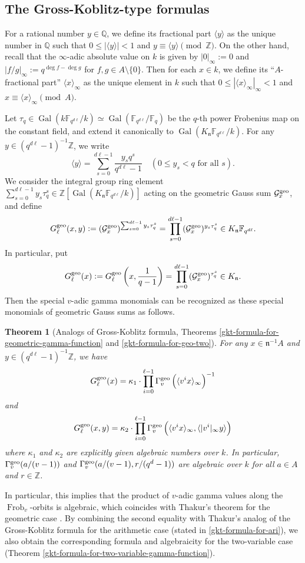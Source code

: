 \documentclass[11pt]{amsart}
\theoremstyle{plain}
\newtheorem{thm}{Theorem}[subsection]
\theoremstyle{definition}
\theoremstyle{remark}
\numberwithin{equation}{section}
\newcommand{\ZZ}{\mathbb{Z}}
\newcommand{\QQ}{\mathbb{Q}}
\newcommand{\FF}{\mathbb{F}}
\newcommand{\nfk}{\mathfrak{n}}
\newcommand{\Gcal}{\mathcal{G}}
\newcommand{\Gal}{\operatorname{Gal}}
\newcommand{\Frob}{\operatorname{Frob}}
\newcommand{\ang}[1]{\langle #1 \rangle}
\newcommand{\anginf}[1]{\langle #1 \rangle_\infty}
\newcommand{\Fq}{\FF_q}
\newcommand{\Fqdl}{\FF_{q^{d\l}}}
\newcommand{\vgg}{\Gamma_v^{\textnormal{geo}}}
\newcommand{\bggs}{\Gcal^{\textnormal{geo}}}
\newcommand{\ggs}{G_\l^{\textnormal{geo}}}
\let\l\ell
\begin{document}
	\subsection{The Gross-Koblitz-type formulas}
	
	For a rational number $y \in \QQ$, we define its fractional part $\ang{y}$ as the unique number in $\QQ$ such that $0 \leq |\ang{y}| <1$ and $y \equiv \ang{y} \pmod{\ZZ}$.
	On the other hand, recall that the $\infty$-adic absolute value on $k$ is given by $|0|_\infty := 0$ and $|f/g|_\infty := q^{\deg f - \deg g}$ for $f,g \in A \setminus\{0\}$.
	Then for each $x \in k$, we define its “$A$-fractional part” $\anginf{x}$ as the unique element in $k$ such that $0 \leq |\anginf{x}|_\infty < 1$ and $x \equiv \anginf{x} \pmod{A}$.
	
	Let $\tau_q \in \Gal(k\Fqdl/k) \simeq \Gal(\Fqdl/\Fq)$ be the $q$-th power Frobenius map on the constant field, and extend it canonically to $\Gal(K_\nfk\Fqdl/k)$.
	For any $y \in (q^{d\l}-1)^{-1} \ZZ$, we write
	$$
	\ang{y} = \sum_{s=0}^{d\l-1} \frac{y_s q^s}{q^{d\l}-1}
	\quad
	(0 \leq y_s < q \text{ for all } s).
	$$
	We consider the integral group ring element $\sum_{s=0}^{d\l-1} y_s \tau_q^s \in \ZZ[\Gal(K_\nfk\Fqdl/k)]$ acting on the geometric Gauss sum $\bggs_x$, and define
	$$
	\ggs(x,y)
	:= (\bggs_x)^{\sum_{s=0}^{d\l-1} y_s \tau_q^s}
	= \prod_{s=0}^{d\l-1} (\bggs_x)^{y_s \tau_q^s} \in K_\nfk\Fqdl.
	$$
	In particular, put
	$$
	\ggs(x)
	:= \ggs \left(x , \frac{1}{q-1} \right)
	= \prod_{s=0}^{d\l-1} (\bggs_x)^{\tau_q^s} \in K_\nfk.
	$$
	Then the special $v$-adic gamma monomials can be recognized as these special monomials of geometric Gauss sums as follows.
	
	\begin{thm}[Analogs of Gross-Koblitz formula, Theorems \ref{gkt-formula-for-geometric-gamma-function} and \ref{gkt-formula-for-geo-two}]
		For any $x \in \nfk^{-1}A$ and $y \in (q^{d\l}-1)^{-1} \ZZ$, we have
		$$
		\ggs(x)
		= \kappa_1 \cdot
		\prod_{i=0}^{\l-1} \vgg \left( \anginf{v^ix} \right)^{-1}
		$$
		and
		$$
		\ggs (x,y)
		= \kappa_2 \cdot
		\prod_{i=0}^{\l-1} \vgg \left( \anginf{v^ix}, \ang{|v^i|_\infty y} \right)
		$$
		where $\kappa_1$ and $\kappa_2$ are explicitly given algebraic numbers over $k$.
		In particular, $\vgg(a/(v-1))$ and $\vgg(a/(v-1),r/(q^d-1))$ are algebraic over $k$ for all $a \in A$ and $r \in \ZZ$.
	\end{thm}
	
	In particular, this implies that the product of $v$-adic gamma values along the $\Frob_v$-orbits is algebraic, which coincides with Thakur's theorem for the geometric case \cite[Corollary 8.6.2]{thakur2004function}.
	By combining the second equality with Thakur's analog of the Gross-Koblitz formula for the arithmetic case (stated in \eqref{gkt-formula-for-ari}), we also obtain the corresponding formula and algebraicity for the two-variable case (Theorem \ref{gkt-formula-for-two-variable-gamma-function}).
	
\end{document}

